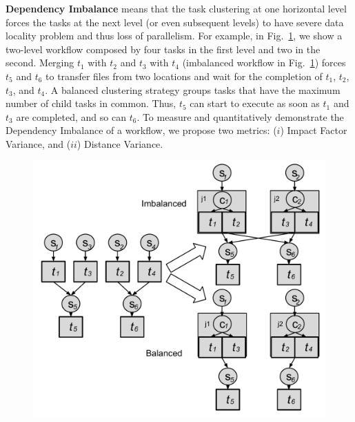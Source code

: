 \documentclass[final]{IEEEtran}
\begin{document}






\textbf{Dependency Imbalance} means that the task clustering at one horizontal level forces the tasks at the next level (or even subsequent levels) to have severe data locality problem and thus loss of parallelism. For example, in Fig.~\ref{fig:dv}, we show a two-level workflow composed by four tasks in the first level and two in the second. Merging $t_1$ with $t_2$ and $t_3$ with $t_4$ (imbalanced workflow in Fig.~\ref{fig:dv}) forces $t_5$ and $t_6$ to transfer files from two locations and wait for the completion of $t_1$, $t_2$, $t_3$, and $t_4$.  A balanced clustering strategy groups tasks that have the maximum number of child tasks in common. Thus, $t_5$ can start to execute as soon as $t_1$ and $t_3$ are completed, and so can $t_6$. To measure and quantitatively demonstrate the Dependency Imbalance of a workflow, we propose two  metrics: ($i$) Impact Factor Variance, and ($ii$) Distance Variance. 

\begin{figure}[htb]
	\centering
	\includegraphics[width=\linewidth]{figure/dv.pdf}
	\label{fig:dv}
	\vspace{-10pt}
\end{figure}
\end{document}
